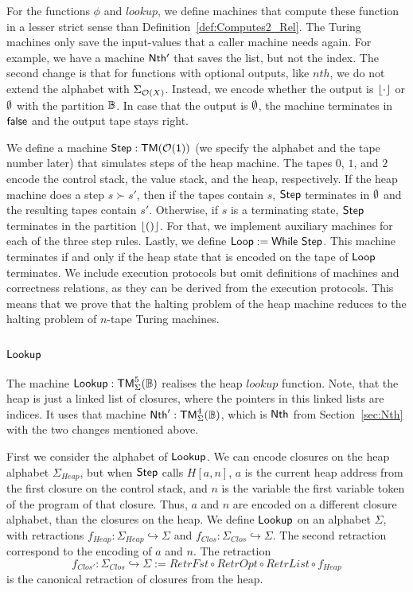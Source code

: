 For the functions $\phi$ and $lookup$, we define machines that compute these function in a lesser strict sense than
Definition~\ref{def:Computes2_Rel}.  The Turing machines only save the input-values that a caller machine needs again.  For example, we have a machine
$\mathsf{Nth'}$ that saves the list, but not the index.  The second change is that for functions with optional outputs, like $nth$, we do not extend the
alphabet with $\Sigma_{\mathcal{O}(X)}$.  Instead, we encode whether the output is $\left\lfloor {\cdot} \right\rfloor$ or $\emptyset$ with the partition $\mathbb{B}$.  In case that the
output is $\emptyset$, the machine terminates in $\mathsf{false}$ and the output tape stays right.

We define a machine $\mathsf{Step} : \mathsf{TM}(\mathcal{O}(\mathsf{1}))$ (we specify the alphabet and the tape number later) that simulates steps of the heap machine.
The tapes $0$, $1$, and $2$ encode the control stack, the value stack, and the heap, respectively.  If the heap machine does a step $s \succ s'$, then
if the tapes contain $s$, $\mathsf{Step}$ terminates in $\emptyset$ and the resulting tapes contain $s'$.  Otherwise, if $s$ is a terminating state,
$\mathsf{Step}$ terminates in the partition $\left\lfloor {\ensuremath{\mathsf{()}}} \right\rfloor$.  For that, we implement auxiliary machines for each of the three step rules.  Lastly, we define
$\mathsf{Loop} := \mathsf{While}~\mathsf{Step}$.  This machine terminates if and only if the heap state that is encoded on the tape of $\mathsf{Loop}$ terminates.  We
include execution protocols but omit definitions of machines and correctness relations, as they can be derived from the execution protocols.  This
means that we prove that the halting problem of the heap machine reduces to the halting problem of $n$-tape Turing machines.


\subsection{$\mathsf{Lookup}$}
\label{sec:Lookup}

The machine $\mathsf{Lookup} : \mathsf{TM}_\Sigma^5(\mathbb{B})$ realises the heap $lookup$ function.  Note, that the heap is just a linked list of closures, where the
pointers in this linked lists are indices.  It uses that machine $\mathsf{Nth}' : \mathsf{TM}_\Sigma^4(\mathbb{B})$, which is $\mathsf{Nth}$ from Section~\ref{sec:Nth}
with the two changes mentioned above.

First we consider the alphabet of $\mathsf{Lookup}$.  We can encode closures on the heap alphabet $\Sigma_{Heap}$, but when $\mathsf{Step}$ calls $H[a,n]$,
$a$ is the current heap address from the first closure on the control stack, and $n$ is the variable the first variable token of the program of that
closure.  Thus, $a$ and $n$ are encoded on a different closure alphabet, than the closures on the heap.  We define $\mathsf{Lookup}$ on an alphabet
$\Sigma$, with retractions $f_{Heap} : \Sigma_{Heap} \hookrightarrow \Sigma$ and $f_{Clos} : \Sigma_{Clos} \hookrightarrow \Sigma$.  The second
retraction correspond to the encoding of $a$ and $n$.  The retraction
\[ f_{Clos'} : \Sigma_{Clos} \hookrightarrow \Sigma := RetrFst \circ RetrOpt \circ RetrList \circ f_{Heap} \]%
is the canonical retraction of closures from the heap.

